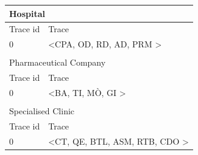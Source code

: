 \begin{table}[t]
\begin{tabular}{lll}
\hline
\multicolumn{3}{|l|}{Hospital}                                                                             \\ \hline
\multicolumn{1}{|l|}{Trace id} & \multicolumn{2}{l|}{Trace}                                                \\ \hline
\multicolumn{1}{|l|}{0}        & \multicolumn{2}{l|}{\textless CPA, OD, RD, AD, PRM \textgreater{}}        \\ \hline
                               &                                      &                                    \\ \hline
\multicolumn{3}{|l|}{Pharmaceutical Company}                                                               \\ \hline
\multicolumn{1}{|l|}{Trace id} & \multicolumn{2}{l|}{Trace}                                                \\ \hline
\multicolumn{1}{|l|}{0}        & \multicolumn{2}{l|}{\textless BA, TI, MÒ, GI \textgreater{}}              \\ \hline
                               &                                      &                                    \\ \hline
\multicolumn{3}{|l|}{Specialised Clinic}                                                                   \\ \hline
\multicolumn{1}{|l|}{Trace id} & \multicolumn{2}{l|}{Trace}                                                \\ \hline
\multicolumn{1}{|l|}{0}        & \multicolumn{2}{l|}{\textless{}CT, QE, BTL, ASM, RTB, CDO \textgreater{}} \\ \hline
\end{tabular}
\end{table}

